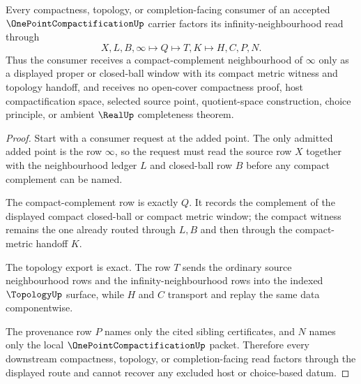 \begin{theorem}
\label{thm:one-point-compactification-compact-neighborhood-handoff}
Every compactness, topology, or completion-facing consumer of an accepted $\OnePointCompactificationUp$ carrier factors its infinity-neighbourhood read through
$$
X,L,B,\infty \longmapsto Q \longmapsto T,K \longmapsto H,C,P,N .
$$
Thus the consumer receives a compact-complement neighbourhood of $\infty$ only as a displayed proper or closed-ball window with its compact metric witness and topology handoff, and receives no open-cover compactness proof, host compactification space, selected source point, quotient-space construction, choice principle, or ambient $\RealUp$ completeness theorem.
\end{theorem}
\begin{proof}
Start with a consumer request at the added point. The only admitted added point is the row $\infty$, so the request must read the source row $X$ together with the neighbourhood ledger $L$ and closed-ball row $B$ before any compact complement can be named.

The compact-complement row is exactly $Q$. It records the complement of the displayed compact closed-ball or compact metric window; the compact witness remains the one already routed through $L,B$ and then through the compact-metric handoff $K$.

The topology export is exact. The row $T$ sends the ordinary source neighbourhood rows and the infinity-neighbourhood rows into the indexed $\TopologyUp$ surface, while $H$ and $C$ transport and replay the same data componentwise.

The provenance row $P$ names only the cited sibling certificates, and $N$ names only the local $\OnePointCompactificationUp$ packet. Therefore every downstream compactness, topology, or completion-facing read factors through the displayed route and cannot recover any excluded host or choice-based datum.
\end{proof}


